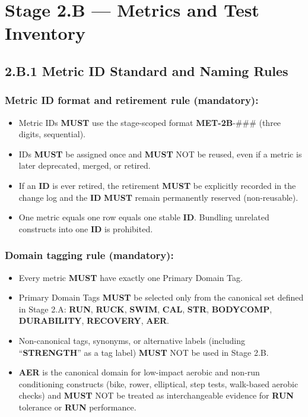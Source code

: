 \documentclass[10pt]{article}
\begin{document}
\section*{Stage 2.B — Metrics and Test Inventory}
{}

\subsection*{2.B.1 Metric \textbf{ID} Standard and Naming Rules}
{}

\subsubsection*{Metric \textbf{ID} format and retirement rule (mandatory):}

\begin{itemize}
\item Metric IDs \textbf{MUST} use the stage-scoped format \textbf{MET-2B}-\#\#\# (three digits, sequential).
\item IDs \textbf{MUST} be assigned once and \textbf{MUST} NOT be reused, even if a metric is later deprecated, merged, or retired.
\item If an \textbf{ID} is ever retired, the retirement \textbf{MUST} be explicitly recorded in the change log and the \textbf{ID} \textbf{MUST} remain permanently reserved (non-reusable).
\item One metric equals one row equals one stable \textbf{ID}. Bundling unrelated constructs into one \textbf{ID} is prohibited.
\end{itemize}

\subsubsection*{Domain tagging rule (mandatory):}

\begin{itemize}
\item Every metric \textbf{MUST} have exactly one Primary Domain Tag.
\item Primary Domain Tags \textbf{MUST} be selected only from the canonical set defined in Stage 2.A: \textbf{RUN}, \textbf{RUCK}, \textbf{SWIM}, \textbf{CAL}, \textbf{STR}, \textbf{BODYCOMP}, \textbf{DURABILITY}, \textbf{RECOVERY}, \textbf{AER}.
\item Non-canonical tags, synonyms, or alternative labels (including “\textbf{STRENGTH}” as a tag label) \textbf{MUST} NOT be used in Stage 2.B.
\item \textbf{AER} is the canonical domain for low-impact aerobic and non-run conditioning constructs (bike, rower, elliptical, step tests, walk-based aerobic checks) and \textbf{MUST} NOT be treated as interchangeable evidence for \textbf{RUN} tolerance or \textbf{RUN} performance.
\end{itemize}
\end{document}
